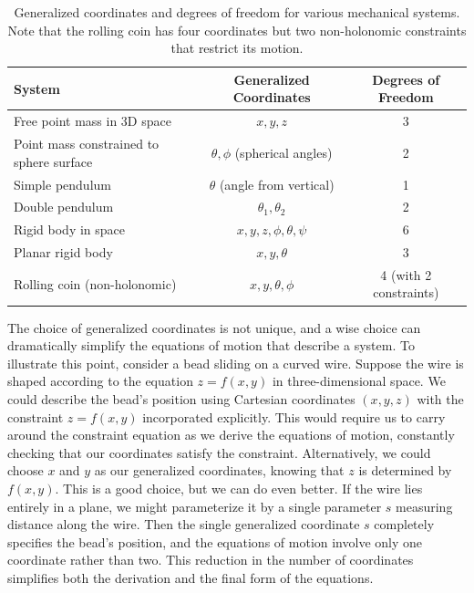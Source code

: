 \begin{table}[htbp]
\centering
\begin{tabular}{|l|c|c|}
\hline
\textbf{System} & \textbf{Generalized Coordinates} & \textbf{Degrees of Freedom} \\
\hline
Free point mass in 3D space & $x, y, z$ & 3 \\
Point mass constrained to sphere surface & $\theta, \phi$ (spherical angles) & 2 \\
Simple pendulum & $\theta$ (angle from vertical) & 1 \\
Double pendulum & $\theta_1, \theta_2$ & 2 \\
Rigid body in space & $x, y, z, \phi, \theta, \psi$ & 6 \\
Planar rigid body & $x, y, \theta$ & 3 \\
Rolling coin (non-holonomic) & $x, y, \theta, \phi$ & 4 (with 2 constraints) \\
\hline
\end{tabular}
\captionsetup{font=small}
\vspace{0.5\baselineskip}
\caption{Generalized coordinates and degrees of freedom for various mechanical systems. Note that the rolling coin has four coordinates but two non-holonomic constraints that restrict its motion.}
\end{table}

The choice of generalized coordinates is not unique, and a wise choice can dramatically simplify the equations of motion that describe a system. To illustrate this point, consider a bead sliding on a curved wire. Suppose the wire is shaped according to the equation $z = f(x, y)$ in three-dimensional space. We could describe the bead's position using Cartesian coordinates $(x, y, z)$ with the constraint $z = f(x, y)$ incorporated explicitly. This would require us to carry around the constraint equation as we derive the equations of motion, constantly checking that our coordinates satisfy the constraint. Alternatively, we could choose $x$ and $y$ as our generalized coordinates, knowing that $z$ is determined by $f(x, y)$. This is a good choice, but we can do even better. If the wire lies entirely in a plane, we might parameterize it by a single parameter $s$ measuring distance along the wire. Then the single generalized coordinate $s$ completely specifies the bead's position, and the equations of motion involve only one coordinate rather than two. This reduction in the number of coordinates simplifies both the derivation and the final form of the equations.

